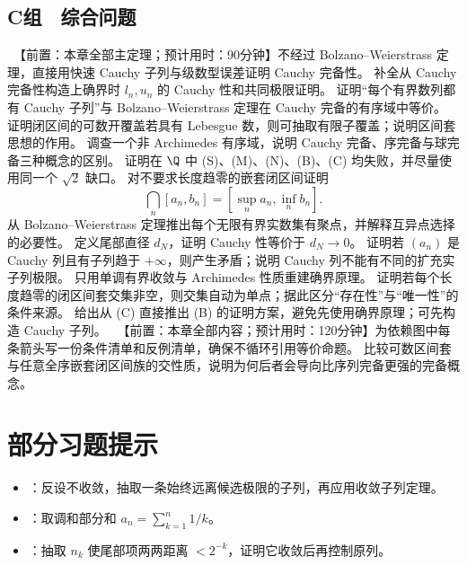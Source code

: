 \subsection*{C组　综合问题}
\begin{enumerate}[label=\textbf{\thechapter.\arabic*.},resume]
  \ 【前置：本章全部主定理；预计用时：90分钟】不经过 Bolzano--Weierstrass 定理，直接用快速 Cauchy 子列与级数型误差证明 Cauchy 完备性。
  补全从 Cauchy 完备性构造上确界时 \(l_n,u_n\) 的 Cauchy 性和共同极限证明。
  证明“每个有界数列都有 Cauchy 子列”与 Bolzano--Weierstrass 定理在 Cauchy 完备的有序域中等价。
  证明闭区间的可数开覆盖若具有 Lebesgue 数，则可抽取有限子覆盖；说明区间套思想的作用。
  调查一个非 Archimedes 有序域，说明 Cauchy 完备、序完备与球完备三种概念的区别。
  证明在 \(\Q\) 中 (S)、(M)、(N)、(B)、(C) 均失败，并尽量使用同一个 \(\sqrt2\) 缺口。
  对不要求长度趋零的嵌套闭区间证明
 \[
  \bigcap_n[a_n,b_n]=[\sup_n a_n,\inf_n b_n].
 \]
  从 Bolzano--Weierstrass 定理推出每个无限有界实数集有聚点，并解释互异点选择的必要性。
  定义尾部直径 \(d_N\)，证明 Cauchy 性等价于 \(d_N\to0\)。
  证明若 \((a_n)\) 是 Cauchy 列且有子列趋于 \(+\infty\)，则产生矛盾；说明 Cauchy 列不能有不同的扩充实子列极限。
  只用单调有界收敛与 Archimedes 性质重建确界原理。
  证明若每个长度趋零的闭区间套交集非空，则交集自动为单点；据此区分“存在性”与“唯一性”的条件来源。
  给出从 (C) 直接推出 (B) 的证明方案，避免先使用确界原理；可先构造 Cauchy 子列。
  \ 【前置：本章全部内容；预计用时：120分钟】为依赖图中每条箭头写一份条件清单和反例清单，确保不循环引用等价命题。
  比较可数区间套与任意全序嵌套闭区间族的交性质，说明为何后者会导向比序列完备更强的完备概念。
\end{enumerate}

\section*{部分习题提示}
\begin{itemize}
 \item {}：反设不收敛，抽取一条始终远离候选极限的子列，再应用收敛子列定理。
 \item {}：取调和部分和 \(a_n=\sum_{k=1}^n1/k\)。
 \item {}：抽取 \(n_k\) 使尾部项两两距离 \(<2^{-k}\)，证明它收敛后再控制原列。
\end{itemize}
